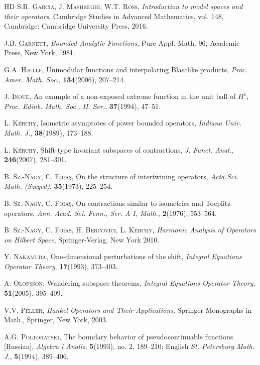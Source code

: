 \documentclass[a4paper,oneside,11pt]{amsart}
\numberwithin{equation}{section}
\theoremstyle{plain}
\theoremstyle{definition}
\begin{document}
\begin{thebibliography}{HD}
   \textsc{S.R. Garcia, J.  Mashreghi, W.T. Ross}, \textit{Introduction to model spaces and their operators},  
Cambridge Studies in Advanced Mathematics, vol. 148, Cambridge: Cambridge University Press, 2016.

   \textsc{J.B. Garnett},  \textit{Bounded Analytic Functions}, Pure Appl. Math. 96, Academic Press, New York, 1981.

   \textsc{G.A. Hjelle},  Unimodular functions and interpolating Blaschke products, 
\textit{Proc. Amer. Math. Soc.}, \textbf{134}(2006),  207--214.

   \textsc{J. Inoue}, An example of a non-exposed extreme function in the unit ball of $H^1$, 
\textit{Proc. Edinb. Math. Soc., II. Ser.}, \textbf{37}(1994),  47--51.

   \textsc{L. K\'erchy}, Isometric asymptotes of power bounded operators, 
    \textit{Indiana Univ. Math. J.}, \textbf{38}(1989), 173--188. 

  \textsc{L. K\'erchy}, Shift-type invariant subspaces of contractions,  \textit{J. Funct.  Anal.},  \textbf{246}(2007), 281--301. 

   \textsc{B. Sz.-Nagy, C.  Foia\c s},  On the structure of intertwining operators,
 \textit{Acta Sci. Math. (Szeged)},   \textbf{35}(1973), 225--254.

\textsc{B. Sz.-Nagy, C.  Foia\c s},   On contractions similar to isometries and Toeplitz operators, 
\textit{Ann. Acad. Sci. Fenn., Ser. A I, Math.}, \textbf{2}(1976), 553--564. 

 \textsc{B. Sz.-Nagy,  C. Foias, H. Bercovici, L. K\'erchy}, 
\textit{Harmonic Analysis of Operators on Hilbert Space}, 
 Springer-Verlag, New York 2010.

 \textsc{Y. Nakamura}, One-dimensional perturbations of the shift, 
\textit{Integral Equations Operator Theory}, \textbf{17}(1993), 373--403.

  \textsc{A. Olofsson}, Wandering subspace theorems, \textit{Integral Equations Operator Theory}, \textbf{51}(2005), 395--409.

  \textsc{V.V. Peller}, \textit{Hankel Operators and Their Applications},    Springer Monographs in Math., Springer, New York, 2003.
 
 \textsc{A.G. Poltoratski}, The boundary behavior of pseudocontinuable functions [Russian],  
 \textit{Algebra i Analiz},  \textbf{5}(1993), no. 2, 189--210; 
English   \textit{St. Petersburg Math. J.},  \textbf{5}(1994),  389--406.


\end{thebibliography}
\end{document}
